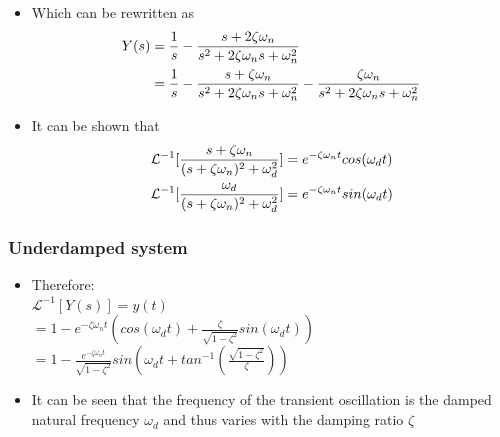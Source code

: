 \begin{frame}
\begin{itemize}
\item Which can be rewritten as\\
\vspace{-0.5cm}
\begin{align*}
Y(s)&=\frac{1}{s} -\frac{s+2\zeta\omega_n}{s^2+2\zeta\omega_n s+ \omega_n ^2} \\ \vspace{0.80cm}
&= \frac{1}{s} -\frac{s+\zeta\omega_n}{s^2+2\zeta\omega_n s+ \omega_n ^2} -\frac{\zeta\omega_n}{s^2+2\zeta\omega_n s+ \omega_n ^2}
\end{align*}
\item It can be shown that
\\ 
\begin{align*}
\mathcal{L}^{-1}[\frac{s+\zeta\omega_n}{(s+\zeta\omega_n)^2+\omega_d ^2}]&= e^{-\zeta\omega_n t}cos(\omega_d t)\\  \vspace{0.80cm}
\mathcal{L}^{-1}[\frac{\omega_d}{(s+\zeta\omega_n)^2+\omega_d ^2}]&= e^{-\zeta\omega_n t}sin(\omega_d t)
\end{align*}
\end{itemize}
\end{frame}



\begin{frame}
\frametitle{Underdamped system}
\begin{itemize}
\item Therefore:\\ 
\vspace{0.25cm}
$\mathcal{L}^{-1}[Y(s)]=y(t)$
\vspace{0.35cm}
\\$ = 1 - e^{-\zeta\omega_n t}(cos(\omega_d t)+\frac{\zeta}{\sqrt{1 - \zeta^2}}sin(\omega_d t))$
\vspace{0.25cm}
\\$ = 1 - \frac{e^{-\zeta\omega_n t}}{\sqrt{1-\zeta^2}}sin(\omega_d t+ tan^{-1}(\frac{\sqrt{1-\zeta^2}}{\zeta}))$
\vspace{0.4cm}
\item It can be seen that the frequency of the transient oscillation is the damped natural frequency $\omega_d$ and thus varies with the damping ratio $\zeta$
\end{itemize}
\end{frame}

